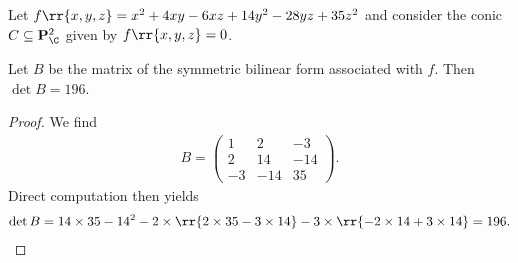 \documentclass{article}
\begin{document}
Let $f\rr{x,y,z}=x^2+4xy-6xz+14y^2-28yz+35z^2$ and consider the conic
$C\subseteq \mathbf P^2_{\C}$ given by $f\rr{x,y,z}=0$.

\begin{claim*}[1]
  Let $B$ be the matrix of the symmetric bilinear form associated with $f$.
  Then $\det B = 196$.
  \begin{proof}
    We find
    \begin{align*}
      B=
      \begin{pmatrix}
        1 & 2 & -3 \\
        2 & 14 & -14 \\
        -3 & -14 & 35
      \end{pmatrix}.
    \end{align*}
    Direct computation then yields
    \begin{align*}
      \det B = 14 \times 35-14^2
      - 2\times\rr{2\times 35-3\times 14}
      - 3\times\rr{-2\times 14+3\times 14}
      =196.
    \end{align*}
  \end{proof}
\end{claim*}
\end{document}
